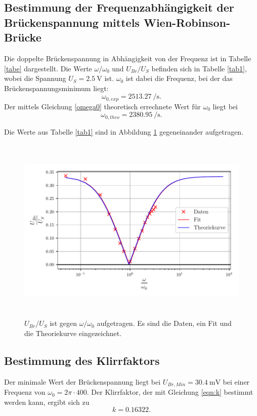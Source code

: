 \subsection{Bestimmung der Frequenzabhängigkeit der Brückenspannung mittels Wien-Robinson-Brücke}
Die doppelte Brückenspannung in Abhängigkeit von der Frequenz ist in Tabelle \ref{tabe} dargestellt.
Die Werte $\omega / \omega_0$ und $U_{Br} / U_S$ befinden sich in Tabelle \ref{tab1}, wobei die Spannung $U_S = \SI{2.5}{\volt}$ ist.
$\omega_0$ ist dabei die Frequenz, bei der das Brückenspannungsminimum liegt:
\begin{equation*}
    \omega_{0,exp} = \SI[per-mode=fraction]{2513.27}{\per\second}.
\end{equation*}
 Der mittels Gleichung \eqref{omega0} theoretisch errechnete Wert für $\omega_0$ liegt bei 
 \begin{equation*}
     \omega_{0,theo} = \SI[per-mode=fraction]{2380.95}{\per\second}.
 \end{equation*}


\noindent Die Werte aus Tabelle \ref{tab1} sind in Abbildung \ref{fig:plot} gegeneinander aufgetragen.
\begin{figure}
 \centering
 \includegraphics[width= 13cm, height= 9cm]{build/plot1.pdf}
 \caption{$U_{Br}/U_S$ ist gegen $\omega / \omega_0$ aufgetragen. Es sind die Daten, ein Fit und die
 Theoriekurve eingezeichnet.}
 \label{fig:plot}
\end{figure}

\subsection{Bestimmung des Klirrfaktors}
Der minimale Wert der Brückenspannung liegt bei $U_{Br,Min} = \SI{30.4}{\milli\volt}$ bei einer Frequenz von 
$\omega_0 = 2 \pi \cdot 400$. 
\newline
Der Klirrfaktor, der mit Gleichung \eqref{eqn:k} bestimmt werden kann, ergibt sich zu
\begin{equation*}
    k = \num{0.16322}. %
\end{equation*}
